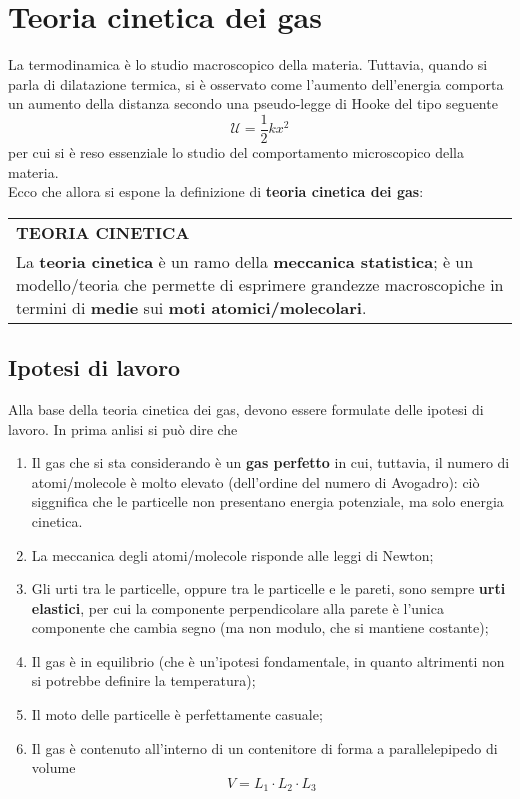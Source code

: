 \documentclass[a4paper]{extarticle}
\renewcommand\arraystretch{}
\begin{document}
\newpage
\section{Teoria cinetica dei gas}
La termodinamica è lo studio macroscopico della materia. Tuttavia, quando si parla di dilatazione termica, si è osservato come l'aumento dell'energia comporta un aumento della distanza secondo una pseudo-legge di Hooke del tipo seguente
\[\mathcal{U} = \frac{1}{2} k x^2\]
per cui si è reso essenziale lo studio del comportamento microscopico della materia.\\
Ecco che allora si espone la definizione di \textbf{teoria cinetica dei gas}:

\vspace{1em}
\setlength{\tabcolsep}{14pt}
\renewcommand{\arraystretch}{2}
\noindent
\begin{tabularx}{\textwidth}{@{}|P|@{}}
    \hline
    {\textbf{TEORIA CINETICA}}\\
    \parbox{\linewidth}{La \textbf{teoria cinetica} è un ramo della \textbf{meccanica statistica}; è un modello/teoria che permette di esprimere grandezze macroscopiche in termini di \textbf{medie} sui \textbf{moti atomici/molecolari}.\vspace{3mm}}\\
    \hline
\end{tabularx}

\vspace{1em}
\subsection{Ipotesi di lavoro}
Alla base della teoria cinetica dei gas, devono essere formulate delle ipotesi di lavoro. In prima anlisi si può dire che
\begin{enumerate}
  \item Il gas che si sta considerando è un \textbf{gas perfetto} in cui, tuttavia, il numero di atomi/molecole è molto elevato (dell'ordine del numero di Avogadro): ciò siggnifica che le particelle non presentano energia potenziale, ma solo energia cinetica.
  \item La meccanica degli atomi/molecole risponde alle leggi di Newton;
  \item Gli urti tra le particelle, oppure tra le particelle e le pareti, sono sempre \textbf{urti elastici}, per cui la componente perpendicolare alla parete è l'unica componente che cambia segno (ma non modulo, che si mantiene costante);
  \item Il gas è in equilibrio (che è un'ipotesi fondamentale, in quanto altrimenti non si potrebbe definire la temperatura);
  \item Il moto delle particelle è perfettamente casuale;
  \item Il gas è contenuto all'interno di un contenitore di forma a parallelepipedo di volume
  \[V=L_1 \cdot L_2 \cdot L_3\]
\end{enumerate}
\end{document}

